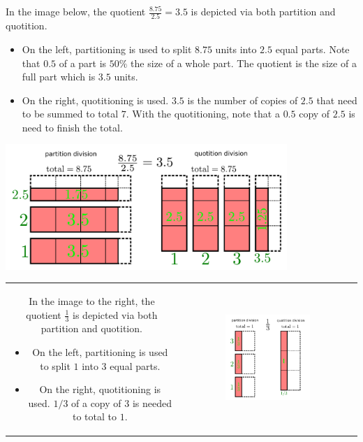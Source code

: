 \documentclass{article}
\begin{document}
\vspace{5mm}


In the image below, the quotient \(\frac{8.75}{2.5} = 3.5\) is depicted via both partition and quotition. 
\begin{itemize}
\item On the left, partitioning is used to split \(8.75\) units into \(2.5\) equal parts. Note that \(0.5\) of a part is \(50\%\) the size of a whole part. The quotient is the size of a full part which is \(3.5\) units. 
\item On the right, quotitioning is used. \(3.5\) is the number of copies of \(2.5\) that need to be summed to total \(7\). With the quotitioning, note that a \(0.5\) copy of \(2.5\) is need to finish the total. 
\end{itemize}
\includegraphics[width = 0.8\textwidth]{8p75_div_2p5}

\vspace{5mm}


\begin{tabular}{cc}
\parbox{0.5\textwidth}{
In the image to the right, the quotient \(\frac{1}{3}\) is depicted via both partition and quotition. 
\begin{itemize}
\item On the left, partitioning is used to split \(1\) into \(3\) equal parts. 
\item On the right, quotitioning is used. \(1/3\) of a copy of \(3\) is needed to total to \(1\). 
\end{itemize}
} & \parbox{0.5\textwidth}{
\includegraphics[width = 0.5\textwidth]{1_div_3}
}
\end{tabular}
\end{document}
